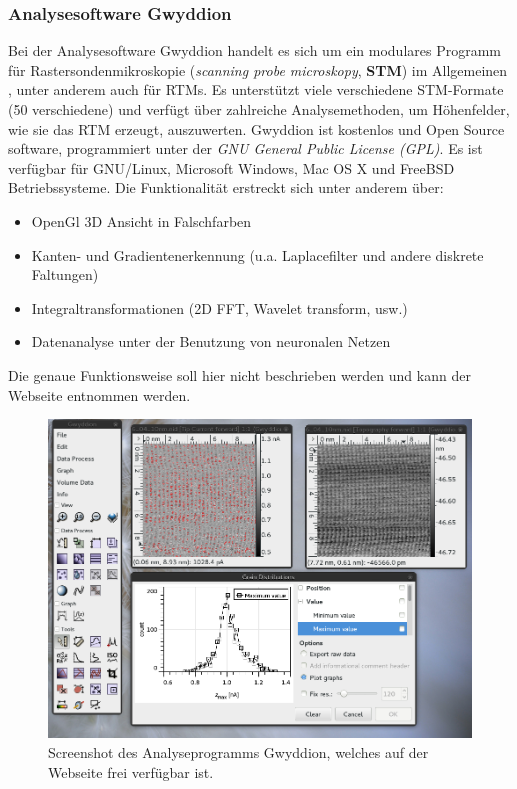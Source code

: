 \subsubsection{Analysesoftware Gwyddion}
Bei der Analysesoftware Gwyddion handelt es sich um ein modulares
Programm für Rastersondenmikroskopie (\textit{scanning probe
microskopy}, \textbf{STM}) 
im Allgemeinen \cite{gwyddion}, unter anderem auch für RTMs.
Es unterstützt viele verschiedene STM-Formate (50 verschiedene)
und verfügt über zahlreiche Analysemethoden, 
um Höhenfelder, wie sie das RTM erzeugt,
auszuwerten. Gwyddion ist kostenlos und Open Source software,
programmiert unter der \textit{GNU General Public License (GPL)}.
Es ist verfügbar für GNU/Linux, Microsoft Windows, Mac OS X und
FreeBSD Betriebssysteme\cite{gwyddion}.
Die Funktionalität erstreckt sich unter anderem über:
\begin{itemize}
    \item OpenGl 3D Ansicht in Falschfarben
    \item Kanten- und Gradientenerkennung (u.a. Laplacefilter und andere diskrete Faltungen)
    \item Integraltransformationen (2D FFT, Wavelet transform, usw.)
    \item Datenanalyse unter der Benutzung von neuronalen Netzen
\end{itemize}
Die genaue Funktionsweise soll hier nicht beschrieben werden
und kann der Webseite\cite{gwyddion} entnommen werden.


\begin{figure}
\includegraphics[width=18cm]{pics/gwyddion_screenshot}
\caption{Screenshot des Analyseprogramms Gwyddion, welches
auf der Webseite frei verfügbar ist\cite{gwyddion}.}
 \label{fig:gwyddion_screenshot}

\end{figure}
